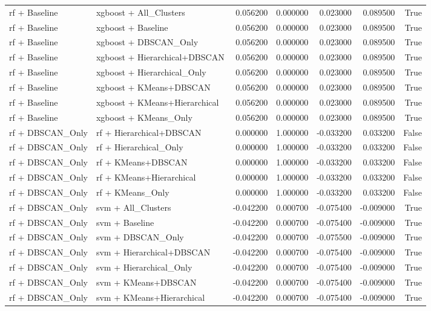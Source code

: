 \begin{tabular}{llrrrrr}
rf + Baseline & xgboost + All_Clusters & 0.056200 & 0.000000 & 0.023000 & 0.089500 & True \\
rf + Baseline & xgboost + Baseline & 0.056200 & 0.000000 & 0.023000 & 0.089500 & True \\
rf + Baseline & xgboost + DBSCAN_Only & 0.056200 & 0.000000 & 0.023000 & 0.089500 & True \\
rf + Baseline & xgboost + Hierarchical+DBSCAN & 0.056200 & 0.000000 & 0.023000 & 0.089500 & True \\
rf + Baseline & xgboost + Hierarchical_Only & 0.056200 & 0.000000 & 0.023000 & 0.089500 & True \\
rf + Baseline & xgboost + KMeans+DBSCAN & 0.056200 & 0.000000 & 0.023000 & 0.089500 & True \\
rf + Baseline & xgboost + KMeans+Hierarchical & 0.056200 & 0.000000 & 0.023000 & 0.089500 & True \\
rf + Baseline & xgboost + KMeans_Only & 0.056200 & 0.000000 & 0.023000 & 0.089500 & True \\
rf + DBSCAN_Only & rf + Hierarchical+DBSCAN & 0.000000 & 1.000000 & -0.033200 & 0.033200 & False \\
rf + DBSCAN_Only & rf + Hierarchical_Only & 0.000000 & 1.000000 & -0.033200 & 0.033200 & False \\
rf + DBSCAN_Only & rf + KMeans+DBSCAN & 0.000000 & 1.000000 & -0.033200 & 0.033200 & False \\
rf + DBSCAN_Only & rf + KMeans+Hierarchical & 0.000000 & 1.000000 & -0.033200 & 0.033200 & False \\
rf + DBSCAN_Only & rf + KMeans_Only & 0.000000 & 1.000000 & -0.033200 & 0.033200 & False \\
rf + DBSCAN_Only & svm + All_Clusters & -0.042200 & 0.000700 & -0.075400 & -0.009000 & True \\
rf + DBSCAN_Only & svm + Baseline & -0.042200 & 0.000700 & -0.075400 & -0.009000 & True \\
rf + DBSCAN_Only & svm + DBSCAN_Only & -0.042200 & 0.000700 & -0.075500 & -0.009000 & True \\
rf + DBSCAN_Only & svm + Hierarchical+DBSCAN & -0.042200 & 0.000700 & -0.075400 & -0.009000 & True \\
rf + DBSCAN_Only & svm + Hierarchical_Only & -0.042200 & 0.000700 & -0.075400 & -0.009000 & True \\
rf + DBSCAN_Only & svm + KMeans+DBSCAN & -0.042200 & 0.000700 & -0.075400 & -0.009000 & True \\
rf + DBSCAN_Only & svm + KMeans+Hierarchical & -0.042200 & 0.000700 & -0.075400 & -0.009000 & True \\

\end{tabular}
